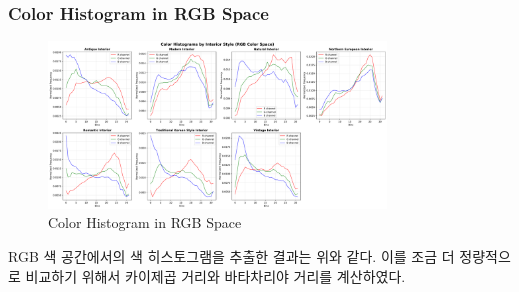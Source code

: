 \documentclass[11pt]{article}
\begin{document}
\subsubsection{Color Histogram in RGB Space}
\begin{figure}[htbp]
    \centering
    \includegraphics[width=0.8\textwidth]{figures/rgb_color_histogram.pdf}
    \caption{Color Histogram in RGB Space}
    \label{fig:rgb_color_histogram}
\end{figure}
RGB 색 공간에서의 색 히스토그램을 추출한 결과는 위와 같다. 이를 조금 더 정량적으로 비교하기 위해서 카이제곱 거리와 바타차리야 거리를 계산하였다.
\end{document}
